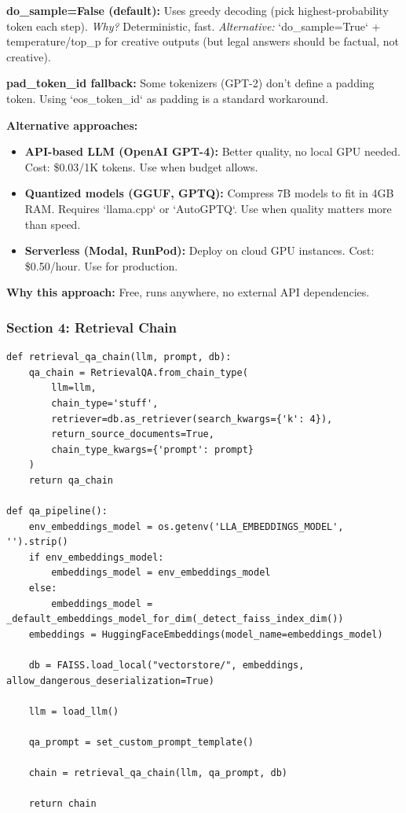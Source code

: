 \documentclass[11pt,a4paper]{article}
\begin{document}
\textbf{do\_sample=False (default):} Uses greedy decoding (pick highest-probability token each step). \textit{Why?} Deterministic, fast. \textit{Alternative:} `do\_sample=True` + temperature/top\_p for creative outputs (but legal answers should be factual, not creative).

\textbf{pad\_token\_id fallback:} Some tokenizers (GPT-2) don't define a padding token. Using `eos\_token\_id` as padding is a standard workaround.

\textbf{Alternative approaches:}
\begin{itemize}
\item \textbf{API-based LLM (OpenAI GPT-4):} Better quality, no local GPU needed. Cost: \$0.03/1K tokens. Use when budget allows.
\item \textbf{Quantized models (GGUF, GPTQ):} Compress 7B models to fit in 4GB RAM. Requires `llama.cpp` or `AutoGPTQ`. Use when quality matters more than speed.
\item \textbf{Serverless (Modal, RunPod):} Deploy on cloud GPU instances. Cost: \$0.50/hour. Use for production.
\end{itemize}

\textbf{Why this approach:} Free, runs anywhere, no external API dependencies.

\subsubsection{Section 4: Retrieval Chain}

\begin{lstlisting}
def retrieval_qa_chain(llm, prompt, db):
    qa_chain = RetrievalQA.from_chain_type(
        llm=llm,
        chain_type='stuff',
        retriever=db.as_retriever(search_kwargs={'k': 4}),
        return_source_documents=True,
        chain_type_kwargs={'prompt': prompt}
    )
    return qa_chain

def qa_pipeline():
    env_embeddings_model = os.getenv('LLA_EMBEDDINGS_MODEL', '').strip()
    if env_embeddings_model:
        embeddings_model = env_embeddings_model
    else:
        embeddings_model = _default_embeddings_model_for_dim(_detect_faiss_index_dim())
    embeddings = HuggingFaceEmbeddings(model_name=embeddings_model)

    db = FAISS.load_local("vectorstore/", embeddings, allow_dangerous_deserialization=True)

    llm = load_llm()

    qa_prompt = set_custom_prompt_template()

    chain = retrieval_qa_chain(llm, qa_prompt, db)

    return chain
\end{lstlisting}
\end{document}
